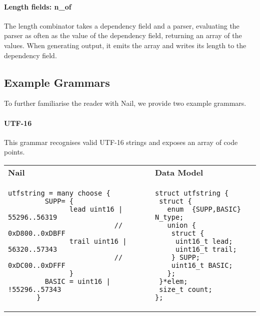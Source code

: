 \documentclass[10pt]{article}
\begin{document}
\paragraph{Length fields: n_of}
The length combinator takes a dependency field and a parser, evaluating the parser as often as the
value of the dependency field, returning an array of the values. When generating output, it emits
the array and writes its length to the dependency field. 

\subsection{Example Grammars}
To further familiarise the reader with Nail, we provide two example grammars. 
\paragraph{UTF-16}
This grammar recognises valid UTF-16 strings and exposes an array of code points. 

\begin{tabular}{ll}
\textbf{Nail} & \textbf{Data Model}\\
\begin{minipage}{3in}
\begin{verbatim}
utfstring = many choose {
         SUPP= {
               lead uint16 | 55296..56319
                          // 0xD800..0xDBFF
               trail uint16 | 56320..57343
                          // 0xDC00..0xDFFF
               }
         BASIC = uint16 | !55296..57343
       }
\end{verbatim}
\end{minipage}
 & 
\begin{minipage}{2in}
\begin{verbatim}
struct utfstring {
 struct {
   enum  {SUPP,BASIC} N_type;
   union {
    struct {
     uint16_t lead;
     uint16_t trail;
    } SUPP;
    uint16_t BASIC;
   };
 }*elem;
 size_t count;
};
\end{verbatim} 
\end{minipage} 
\\
\end{tabular}
\end{document}
